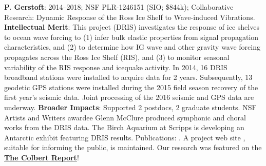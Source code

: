 {\bf  P. Gerstoft}: 2014--2018; NSF PLR-1246151 (SIO; \$844k); Collaborative Research: Dynamic Response of the Ross Ice Shelf to Wave-induced Vibrations. {\bf Intellectual Merit}: This project (DRIS) investigates the response of ice shelves to ocean wave forcing to (1) infer bulk elastic properties from signal propagation characteristics, and (2) to determine how IG wave and other gravity wave forcing propagates across the Ross Ice Shelf (RIS), and (3) to monitor seasonal variability of the RIS response and icequake activity. In 2014, 16 DRIS broadband stations were installed to acquire data for 2 years. Subsequently, 13 geodetic GPS stations were installed during the 2015 field season recovery of the first year’s seismic data. Joint processing of the 2016 seismic and GPS data are underway. {\bf Broader Impacts}: Supported 2 postdocs, 2 graduate students. NSF Artists and Writers awardee Glenn McClure produced symphonic and choral works from the DRIS data. The Birch Aquarium at Scripps is developing an Antarctic exhibit featuring DRIS results. Publications: \cite{bromirski2015,diez2016,bromirski2017,chen2018,shen2018,chaput2018,white2019}. 
A project web site \href{https://scripps.ucsd.edu/centers/iceshelfvibes/}, suitable for informing the public, is maintained. 
Our research was featured on the %
\href{https://www.youtube.com/watch?v=djesneud0Yg&fbclid=IwAR1zgpupmvZv2lFUy2ce2bLAgpIvi0M7OBW7P0koa0VwpwfMg5-8Pyg9hwE&app=desktop}{\bf The Colbert Report}!


